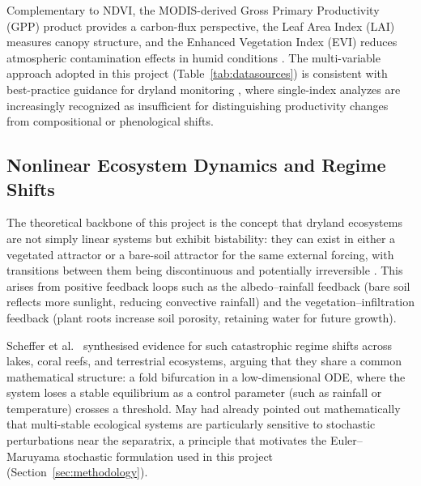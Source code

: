 \documentclass[12pt, a4paper]{article}
\begin{document}
Complementary to NDVI, the MODIS-derived Gross Primary Productivity (GPP) product provides a carbon-flux perspective, the Leaf Area Index (LAI) measures canopy structure, and the Enhanced Vegetation Index (EVI) reduces atmospheric contamination effects in humid conditions \cite{didan2021}. The multi-variable approach adopted in this project (Table~\ref{tab:datasources}) is consistent with best-practice guidance for dryland monitoring \cite{fensholt2012}, where single-index analyzes are increasingly recognized as insufficient for distinguishing productivity changes from compositional or phenological shifts.

\subsection{Nonlinear Ecosystem Dynamics and Regime Shifts}

The theoretical backbone of this project is the concept that dryland ecosystems are not simply linear systems but exhibit bistability: they can exist in either a vegetated attractor or a bare-soil attractor for the same external forcing, with transitions between them being discontinuous and potentially irreversible \cite{strogatz2015}. This arises from positive feedback loops such as the albedo--rainfall feedback (bare soil reflects more sunlight, reducing convective rainfall) and the vegetation--infiltration feedback (plant roots increase soil porosity, retaining water for future growth).

Scheffer et al.\ \cite{scheffer2009} synthesised evidence for such catastrophic regime shifts across lakes, coral reefs, and terrestrial ecosystems, arguing that they share a common mathematical structure: a fold bifurcation in a low-dimensional ODE, where the system loses a stable equilibrium as a control parameter (such as rainfall or temperature) crosses a threshold. May \cite{may1977} had already pointed out mathematically that multi-stable ecological systems are particularly sensitive to stochastic perturbations near the separatrix, a principle that motivates the Euler--Maruyama stochastic formulation used in this project (Section~\ref{sec:methodology}).

\end{document}
